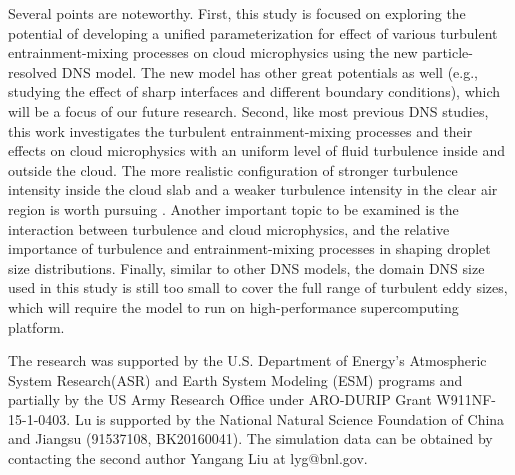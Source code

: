 \documentclass[draft,linenumbers]{agujournal}
\begin{document}
{Several points are noteworthy. First, this study is focused on exploring the potential of developing a unified parameterization for effect of various turbulent entrainment-mixing processes on cloud microphysics using the new particle-resolved DNS model. The new model has other great potentials as well (e.g., studying the effect of sharp interfaces and different boundary conditions), which will be a focus of our future research. Second, like most previous DNS studies, this work investigates the turbulent entrainment-mixing processes and their effects on cloud microphysics with an uniform level of fluid turbulence inside and outside the cloud. The more realistic configuration of stronger turbulence intensity inside the cloud slab and a weaker turbulence intensity in the clear air region is worth pursuing \citep{gotzfried2017}.} Another important topic to be examined is the interaction between turbulence and cloud microphysics, and the relative importance of turbulence and entrainment-mixing processes in shaping droplet size distributions. Finally, similar to other DNS models, the domain DNS size used in this study is still too small to cover the full range of turbulent eddy sizes, which will require the model to run on high-performance supercomputing platform.

\acknowledgments
The research was supported by the U.S. Department of Energy's Atmospheric System Research(ASR) and Earth System Modeling (ESM) programs and partially by the US Army Research Office under ARO-DURIP Grant W911NF-15-1-0403. Lu is supported by the National Natural Science Foundation of China and Jiangsu (91537108, BK20160041). The simulation data can be obtained by contacting the second author Yangang Liu at lyg@bnl.gov.
\end{document}
